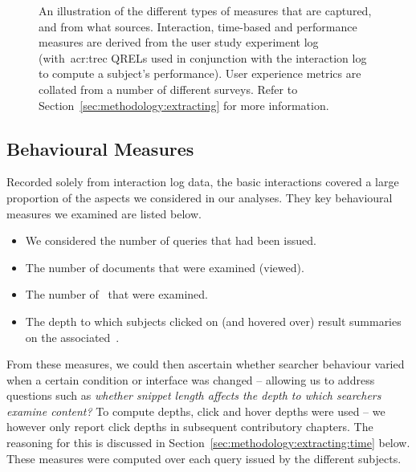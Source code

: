 \begin{figure}[t!]
    \centering
    \caption[Examples of evaluation measures]{An illustration of the different types of measures that are captured, and from what sources. Interaction, time-based and performance measures are derived from the user study experiment log (with~\gls{acr:trec} QRELs used in conjunction with the interaction log to compute a subject's performance). User experience metrics are collated from a number of different surveys. Refer to Section~\ref{sec:methodology:extracting} for more information.}
    \label{fig:evaluation_methodology}
\end{figure}

\subsection{Behavioural Measures}
Recorded solely from interaction log data, the basic interactions covered a large proportion of the aspects we considered in our analyses. They key behavioural measures we examined are listed below.

\begin{itemize}
    \item{ We considered the number of queries that had been issued.}
    \item{ The number of documents that were examined (viewed).}
    \item{ The number of~ that were examined.}
    \item{ The depth to which subjects clicked on (and hovered over) result summaries on the associated~.}
\end{itemize}

From these measures, we could then ascertain whether searcher behaviour varied when a certain condition or interface was changed -- allowing us to address questions such as \emph{whether snippet length affects the depth to which searchers examine content?} To compute depths, click and hover depths were used -- we however only report click depths in subsequent contributory chapters. The reasoning for this is discussed in Section~\ref{sec:methodology:extracting:time} below. These measures were computed over each query issued by the different subjects.

